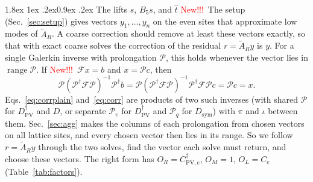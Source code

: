\documentclass[11pt,a4paper]{article}
\makeatletter
\newif\ifshownew \shownewtrue
\DeclareRobustCommand\New{\ifshownew\textcolor{red}{New!!!}\ \else\ignorespaces\fi}
\renewcommand\subsubsection{\@startsection{subsubsection}{3}{\z@}%
  {1.8ex \@plus 1ex \@minus .2ex}{0.9ex \@plus .2ex}%
  {\centering\normalfont\small\bfseries\itshape}}
\numberwithin{equation}{section}
\newcommand{\dg}{^{\dagger}}
\newcommand{\Dpv}{D_{\mathrm{PV}}}
\newcommand{\AR}{\tilde A_{R}}
\newcommand{\Pro}{\mathcal P}
\newcommand{\Pq}{\Pro_q}
\newcommand{\Pv}{\Pro_v}
\newcommand{\Dsym}{D_{\mathrm{sym}}}
\newcommand{\Ce}{C_{e}}
\newcommand{\Cpve}{C_{\mathrm{PV},e}}
\makeatother
\begin{document}
\subsubsection{The lifts \texorpdfstring{$s$}{s}, \texorpdfstring{$B_5s$}{B5 s}, and \texorpdfstring{$\hat t$}{t}}
\label{sec:basis}
\New The setup (Sec.~\ref{sec:setup}) gives vectors $y_1,\dots,y_n$ on the even
sites that approximate low modes of $\AR$. A coarse correction should remove at least these
vectors exactly, so that with exact coarse solves the correction of the residual $r=\AR y$ is $y$.
For a single Galerkin inverse with prolongation $\Pro$, this holds whenever the vector lies in
$\operatorname{range}\Pro$. If \New $\mathcal Fx=b$ and $x=\Pro c$, then
\begin{equation}
\Pro(\Pro\dg \mathcal F\Pro)^{-1}\Pro\dg b=\Pro(\Pro\dg \mathcal F\Pro)^{-1}\Pro\dg \mathcal F\Pro c=\Pro c=x .
\label{eq:galexact}
\end{equation}
Eqs.~\eqref{eq:corrplain} and~\eqref{eq:corr} are products of two such inverses (with shared
$\Pro$ for $\Dpv\dg$ and $D$, or separate $\Pv$ for $\Dpv\dg$ and $\Pq$ for $\Dsym$) with $\pi$
and $\iota$ between them. Sec.~\ref{sec:agg} makes the columns of each prolongation from chosen
vectors on all lattice sites, and every chosen vector then lies in its range. So we follow
$r=\AR y$ through the two solves, find the vector each solve must return, and choose these vectors.
The right form has $O_R=\Cpve\dg$, $O_M=1$, $O_L=\Ce$ (Table~\ref{tab:factors}).
\end{document}
